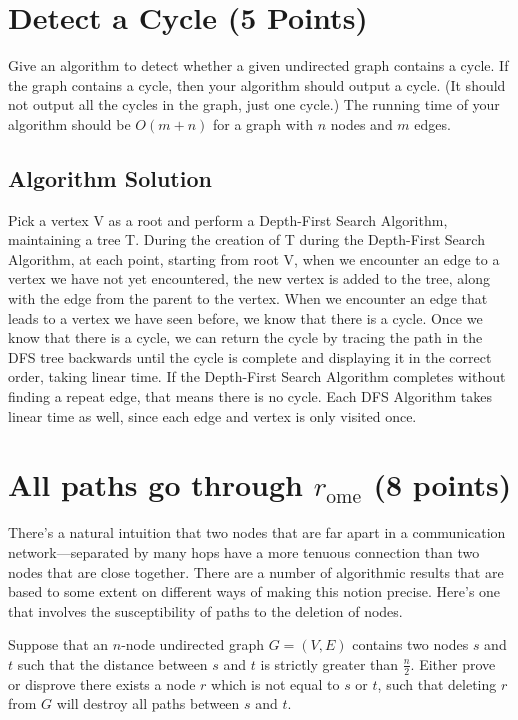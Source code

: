 \documentclass[letter,11pt]{article}
\begin{document}
\section{Detect a Cycle (5 Points)}
Give an algorithm to detect whether a given undirected graph contains a cycle. If the graph contains a cycle, then your algorithm should output a cycle. (It should not output all the cycles in the graph, just one cycle.) The running time of your algorithm should be $O(m + n)$ for a graph with $n$ nodes and $m$ edges.

\subsection{Algorithm Solution}

Pick a vertex V as a root and perform a Depth-First Search Algorithm, maintaining a tree T. During the creation of T during the Depth-First Search Algorithm, at each point, starting from root V, when we encounter an edge to a vertex we have not yet encountered, the new vertex is added to the tree, along with the edge from the parent to the vertex. When we encounter an edge that leads to a vertex we have seen before, we know that there is a cycle. Once we know that there is a cycle, we can return the cycle by tracing the path in the DFS tree backwards until the cycle is complete and displaying it in the correct order, taking linear time. If the Depth-First Search Algorithm completes without finding a repeat edge, that means there is no cycle. Each DFS Algorithm takes linear time as well, since each edge and vertex is only visited once.



\section{All paths go through $r_{\text{ome}}$ (8 points)}

There's a natural intuition that two nodes that are far apart in a communication network—separated by many hops have a more tenuous connection than two nodes that are close together. There are a number of algorithmic results that are based to some extent on different ways of making this notion precise. Here's one that involves the susceptibility of paths to the deletion of nodes.

Suppose that an $n$-node undirected graph $G = (V, E)$ contains two nodes $s$ and $t$ such that the distance between $s$ and $t$ is strictly greater than $\frac{n}{2}$.  Either prove or disprove there exists a node $r$ which is not equal to $s$ or $t$, such that deleting $r$ from $G$ will destroy all paths between $s$ and $t$.
\end{document}
